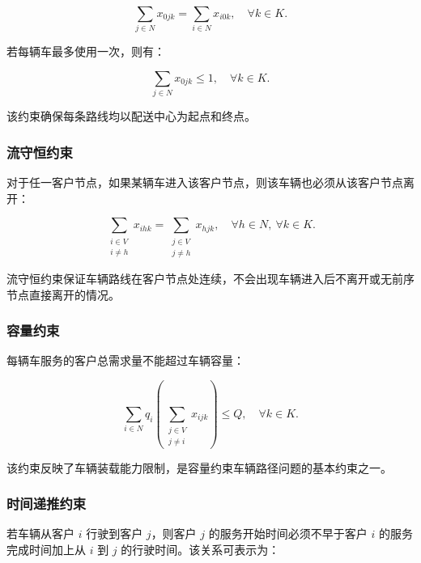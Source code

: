 \documentclass[12pt,a4paper,UTF8]{article}
\begin{document}
\begin{equation}
    \sum_{j\in N}x_{0jk}
    =
    \sum_{i\in N}x_{i0k},
    \quad \forall k\in K.
    \label{eq:depot_balance}
\end{equation}

若每辆车最多使用一次，则有：

\begin{equation}
    \sum_{j\in N}x_{0jk}\leq 1,
    \quad \forall k\in K.
    \label{eq:vehicle_use_once}
\end{equation}

该约束确保每条路线均以配送中心为起点和终点。

\subsubsection{流守恒约束}

对于任一客户节点，如果某辆车进入该客户节点，则该车辆也必须从该客户节点离开：

\begin{equation}
    \sum_{\substack{i\in V\\i\ne h}}x_{ihk}
    =
    \sum_{\substack{j\in V\\j\ne h}}x_{hjk},
    \quad \forall h\in N,\ \forall k\in K.
    \label{eq:flow_conservation}
\end{equation}

流守恒约束保证车辆路线在客户节点处连续，不会出现车辆进入后不离开或无前序节点直接离开的情况。

\subsubsection{容量约束}

每辆车服务的客户总需求量不能超过车辆容量：

\begin{equation}
    \sum_{i\in N}q_i
    \left(
        \sum_{\substack{j\in V\\j\ne i}}x_{ijk}
    \right)
    \leq Q,
    \quad \forall k\in K.
    \label{eq:capacity_constraint}
\end{equation}

该约束反映了车辆装载能力限制，是容量约束车辆路径问题的基本约束之一。

\subsubsection{时间递推约束}

若车辆从客户 $i$ 行驶到客户 $j$，则客户 $j$ 的服务开始时间必须不早于客户 $i$ 的服务完成时间加上从 $i$ 到 $j$ 的行驶时间。该关系可表示为：
\end{document}

